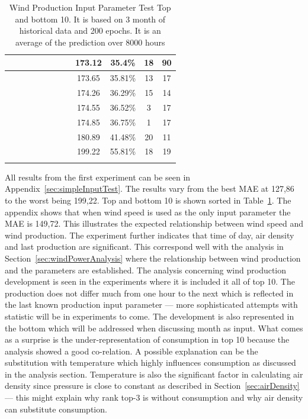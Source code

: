\begin{center}
\begin{longtable}{|c|c|c|c|c|c|c|c|c|c|c|c|}
 \x &  &  &  &  \x &  \x &  \x &  & 173.12 & 35.4\% & 18 & 90 \\ \hline
 \x &  &  \x &  \x &  &  \x &  \x &  \x & 173.65 & 35.81\% & 13 & 17 \\ \hline
 \x &  \x &  \x &  \x &  \x &  \x &  \x &  \x & 174.26 & 36.29\% & 15 & 14 \\ \hline
 \x &  \x &  &  \x &  &  \x &  \x &  \x & 174.55 & 36.52\% & 3 & 17 \\ \hline
 \x &  &  &  \x &  &  \x &  \x &  \x & 174.85 & 36.75\% & 1 & 17 \\ \hline
 \x &  \x &  \x &  &  \x &  \x &  \x &  & 180.89 & 41.48\% & 20 & 11 \\ \hline
 \x &  \x &  &  &  \x &  \x &  \x &  \x & 199.22 & 55.81\% & 18 & 19 \\ \hline
\caption{Wind Production Input Parameter Test Top and bottom 10. It is based on 3 month of historical data and 200 epochs. It is an average of the prediction over 8000 hours}
\label{table:windProdInputParamsTop10}
\end{longtable}
\end{center}
\normalsize

All results from the first experiment can be seen in Appendix~\ref{sec:simpleInputTest}. The results vary from the best MAE at 127,86 to the worst being 199,22. Top and bottom 10 is shown sorted in Table~\ref{table:windProdInputParamsTop10}. The appendix shows that when wind speed is used as the only input parameter the MAE is 149,72. This illustrates the expected relationship between wind speed and wind production. The experiment further indicates that time of day, air density and last production are significant. This correspond well with the analysis in Section~\ref{sec:windPowerAnalysis} where the relationship between wind production and the parameters are established. The analysis concerning wind production development is seen in the experiments where it is included it all of top 10. The production does not differ much from one hour to the next which is reflected in the last known production input parameter --- more sophisticated attempts with statistic will be in experiments to come. The development is also represented in the bottom which will be addressed when discussing month as input. What comes as a surprise is the under-representation of consumption in top 10 because the analysis showed a good co-relation. A possible explanation can be the substitution with temperature which highly influences consumption as discussed in the analysis section. Temperature is also the significant factor in calculating air density since pressure is close to constant as described in Section~\ref{sec:airDensity} --- this might explain why rank top-3 is without consumption and why air density can substitute consumption.

